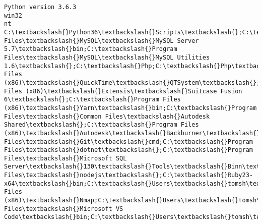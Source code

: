 \documentclass[11pt]{article}
\begin{document}
    \begin{Verbatim}[commandchars=\\\{\}]
Python version 3.6.3
win32
nt
C:\textbackslash{}Python36\textbackslash{}Scripts\textbackslash{};C:\textbackslash{}Python36\textbackslash{};C:\textbackslash{}WINDOWS\textbackslash{}system32;C:\textbackslash{}WINDOWS;C:\textbackslash{}WINDOWS\textbackslash{}System32\textbackslash{}Wbem;C:\textbackslash{}WINDOWS\textbackslash{}System32\textbackslash{}WindowsPowerShell\textbackslash{}v1.0\textbackslash{};C:\textbackslash{}SysInternals;C:\textbackslash{}Program Files\textbackslash{}MySQL\textbackslash{}MySQL Server 5.7\textbackslash{}bin;C:\textbackslash{}Program Files\textbackslash{}MySQL\textbackslash{}MySQL Utilities 1.6\textbackslash{};C:\textbackslash{}Php;C:\textbackslash{}Php\textbackslash{}includes;C:\textbackslash{}Composer;C:\textbackslash{}Program Files (x86)\textbackslash{}QuickTime\textbackslash{}QTSystem\textbackslash{};C:\textbackslash{}Program Files (x86)\textbackslash{}Extensis\textbackslash{}Suitcase Fusion 6\textbackslash{};C:\textbackslash{}Program Files (x86)\textbackslash{}Yarn\textbackslash{}bin;C:\textbackslash{}Program Files\textbackslash{}Common Files\textbackslash{}Autodesk Shared\textbackslash{};C:\textbackslash{}Program Files (x86)\textbackslash{}Autodesk\textbackslash{}Backburner\textbackslash{};C:\textbackslash{}Program Files\textbackslash{}Git\textbackslash{}cmd;C:\textbackslash{}Program Files\textbackslash{}dotnet\textbackslash{};C:\textbackslash{}Program Files\textbackslash{}Microsoft SQL Server\textbackslash{}130\textbackslash{}Tools\textbackslash{}Binn\textbackslash{};C:\textbackslash{}Go\textbackslash{}bin;C:\textbackslash{}Projects\textbackslash{}Go\textbackslash{}bin;C:\textbackslash{}Program Files\textbackslash{}nodejs\textbackslash{};C:\textbackslash{}Ruby23-x64\textbackslash{}bin;C:\textbackslash{}Users\textbackslash{}tomsh\textbackslash{}AppData\textbackslash{}Local\textbackslash{}Microsoft\textbackslash{}WindowsApps;C:\textbackslash{}Program Files (x86)\textbackslash{}Nmap;C:\textbackslash{}Users\textbackslash{}tomsh\textbackslash{}AppData\textbackslash{}Local\textbackslash{}atom\textbackslash{}bin;C:\textbackslash{}Users\textbackslash{}tomsh\textbackslash{}AppData\textbackslash{}Local\textbackslash{}Yarn\textbackslash{}.bin;C:\textbackslash{}Users\textbackslash{}tomsh\textbackslash{}AppData\textbackslash{}Local\textbackslash{}Microsoft\textbackslash{}WindowsApps;C:\textbackslash{}Program Files\textbackslash{}Microsoft VS Code\textbackslash{}bin;C:\textbackslash{}Users\textbackslash{}tomsh\textbackslash{}AppData\textbackslash{}Roaming\textbackslash{}npm;C:\textbackslash{}Users\textbackslash{}tomsh\textbackslash{}AppData\textbackslash{}Local\textbackslash{}GitHubDesktop\textbackslash{}bin

\end{Verbatim}
\end{document}

